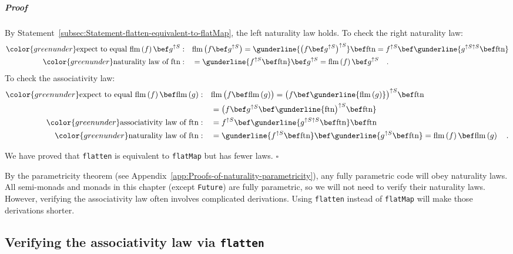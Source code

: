 \subparagraph{Proof}

By Statement~\ref{subsec:Statement-flatten-equivalent-to-flatMap},
the left naturality law holds. To check the right naturality law:
\begin{align*}
{\color{greenunder}\text{expect to equal }\text{flm}\left(f\right)\bef g^{\uparrow S}:}\quad & \text{flm}\,\big(f\bef g^{\uparrow S}\big)=\gunderline{\big(f\bef g^{\uparrow S}\big)^{\uparrow S}}\bef\text{ftn}=f^{\uparrow S}\bef\gunderline{g^{\uparrow S\uparrow S}\bef\text{ftn}}\\
{\color{greenunder}\text{naturality law of }\text{ftn}:}\quad & =\gunderline{f^{\uparrow S}\bef\text{ftn}}\bef g^{\uparrow S}=\text{flm}\left(f\right)\bef g^{\uparrow S}\quad.
\end{align*}
To check the associativity law:
\begin{align*}
{\color{greenunder}\text{expect to equal }\text{flm}\left(f\right)\bef\text{flm}\left(g\right):}\quad & \text{flm}\,\big(f\bef\text{flm}\,(g)\big)=\big(f\bef\gunderline{\text{flm}\,(g)}\big)^{\uparrow S}\bef\text{ftn}\\
 & =\big(f\bef g^{\uparrow S}\bef\gunderline{\text{ftn}\big)^{\uparrow S}\bef\text{ftn}}\\
{\color{greenunder}\text{associativity law of }\text{ftn}:}\quad & =f^{\uparrow S}\bef\gunderline{g^{\uparrow S\uparrow S}\bef\text{ftn}}\bef\text{ftn}\\
{\color{greenunder}\text{naturality law of }\text{ftn}:}\quad & =\gunderline{f^{\uparrow S}\bef\text{ftn}}\bef\gunderline{g^{\uparrow S}\bef\text{ftn}}=\text{flm}\left(f\right)\bef\text{flm}\left(g\right)\quad.
\end{align*}
 

We have proved that \lstinline!flatten! is equivalent to \lstinline!flatMap!
but has fewer laws. $\square$

By the parametricity theorem (see Appendix~\ref{app:Proofs-of-naturality-parametricity}),
any fully parametric code will obey naturality laws. All semi-monads
and monads in this chapter (except \lstinline!Future!) are fully
parametric, so we will not need to verify their naturality laws. However,
verifying the associativity law often involves complicated derivations.
Using \lstinline!flatten! instead of \lstinline!flatMap! will make
those derivations shorter.

\subsection{Verifying the associativity law via \texttt{flatten}}

